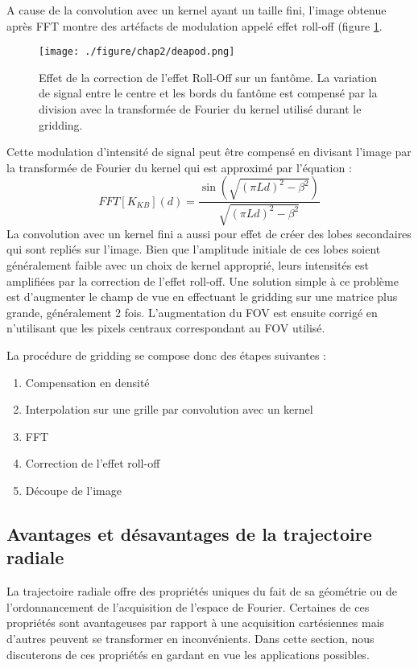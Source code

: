 A cause de la convolution avec un kernel ayant un taille fini, l'image obtenue après FFT montre des artéfacts de modulation appelé effet roll-off (figure \ref{fig:deapod}.
\begin{figure}[H]
\centering
\texttt{[image: ./figure/chap2/deapod.png]}
\caption[Correction effet Roll-Off]{\label{fig:deapod} Effet de la correction de l'effet Roll-Off sur un fantôme. La variation de signal entre le centre et les bords du fantôme est compensé par la division avec la transformée de Fourier du kernel utilisé durant le gridding.}
\end{figure}
Cette modulation d'intensité de signal peut être compensé en divisant l'image par la transformée de Fourier du kernel qui est approximé par l'équation :
\begin{equation}
	FFT[K_{KB}](d) = \frac{\sin(\sqrt{(\pi L d)^2-\beta^2})}{\sqrt{(\pi L d)^2-\beta^2}}
\end{equation}
La convolution avec un kernel fini a aussi pour effet de créer des lobes secondaires qui sont repliés sur l'image.  Bien que l'amplitude initiale de ces lobes soient généralement faible avec un choix de kernel approprié, leurs intensités est amplifiées par la correction de l'effet roll-off. Une solution simple à ce problème est d'augmenter le champ de vue en effectuant le gridding sur une matrice plus grande, généralement 2 fois. L'augmentation du FOV est ensuite corrigé en n'utilisant que les pixels centraux correspondant au FOV utilisé.

La procédure de gridding se compose donc des étapes suivantes :
\begin{enumerate}
\item Compensation en densité
\item Interpolation sur une grille par convolution avec un kernel
\item FFT
\item Correction de l'effet roll-off
\item Découpe de l'image
\end{enumerate}

\subsection{Avantages et désavantages de la trajectoire radiale}

La trajectoire radiale offre des propriétés uniques du fait de sa géométrie ou de l'ordonnancement de l'acquisition de l'espace de Fourier. Certaines de ces propriétés sont avantageuses par rapport à une acquisition cartésiennes mais d'autres peuvent se transformer en inconvénients. Dans cette section, nous discuterons de ces propriétés en gardant en vue les applications possibles.
 
